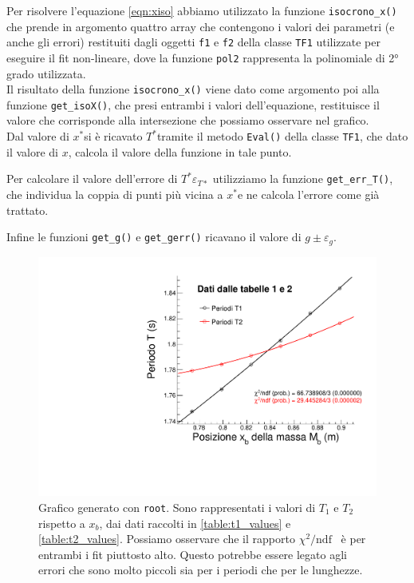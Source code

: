 \documentclass[italian, a4paper, 10pt, twocolumn]{../../style/lab_unige}
\newcommand{\stdErr}[1]{$\varepsilon_{#1}$}
\newcommand{\mstdErr}[1]{\varepsilon_{#1}}
\newcommand{\ChiNdf}{$\chi^2/\text{ndf}$}
\newcommand{\cernroot}{\texttt{root}}
\newcommand{\Tiso}{$T^*$}
\newcommand{\xiso}{$x^*$}
\begin{document}
    Per risolvere l'equazione \ref{eqn:xiso} abbiamo utilizzato la funzione \verb|isocrono_x()| che prende in argomento quattro array che contengono i valori dei parametri (e anche gli errori) restituiti dagli oggetti  \verb|f1| e \verb|f2| della classe \verb|TF1| utilizzate per eseguire il fit non-lineare, dove la funzione \verb|pol2| rappresenta la polinomiale di 2° grado utilizzata.\\
    Il risultato della funzione \verb|isocrono_x()| viene dato come argomento poi alla funzione \verb|get_isoX()|, che presi entrambi i valori dell'equazione, restituisce il valore che corrisponde alla intersezione che possiamo osservare nel grafico.\\
    Dal valore di \xiso si è ricavato \Tiso tramite il metodo \verb|Eval()| della classe \verb|TF1|, che dato il valore di $x$, calcola il valore della funzione in tale punto.

    Per calcolare il valore dell'errore di \Tiso \stdErr{T*} utilizziamo la funzione \verb|get_err_T()|, che individua la coppia di punti più vicina a \xiso e ne calcola l'errore come già trattato.

    Infine le funzioni \verb|get_g()| e \verb|get_gerr()| ricavano il valore di $g\pm\mstdErr{g}$.

    \begin{figure}
        \centering
        \includegraphics[width=\linewidth]{kater_plot.pdf}
        \caption{Grafico generato con \cernroot. Sono rappresentati i valori di $T_1$ e $T_2$ rispetto a $x_b$, dai dati raccolti in \autoref{table:t1_values} e \autoref{table:t2_values}. Possiamo osservare che il rapporto \ChiNdf~ è per entrambi i fit piuttosto alto. Questo potrebbe essere legato agli errori che sono molto piccoli sia per i periodi che per le lunghezze. }
        \label{figure:plot}
    \end{figure}
\end{document}
